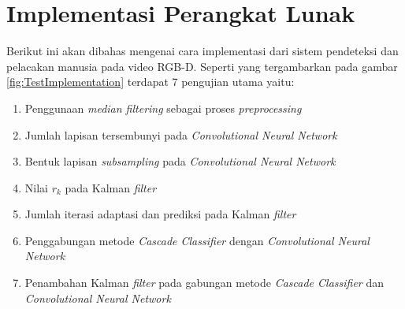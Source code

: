 \section{Implementasi Perangkat Lunak}
\noindent Berikut ini akan dibahas mengenai cara implementasi dari sistem pendeteksi dan pelacakan manusia pada video RGB-D. Seperti yang tergambarkan pada gambar \ref{fig:TestImplementation} terdapat 7 pengujian utama yaitu:
\begin{enumerate}
\item Penggunaan \textit{median filtering} sebagai proses \textit{preprocessing}
\item Jumlah lapisan tersembunyi pada \textit{Convolutional Neural Network}
\item Bentuk lapisan \textit{subsampling} pada \textit{Convolutional Neural Network}
\item Nilai $r_{k}$ pada Kalman \textit{filter}
\item Jumlah iterasi adaptasi dan prediksi pada Kalman \textit{filter}
\item Penggabungan metode \textit{Cascade Classifier} dengan \textit{Convolutional Neural Network}
\item Penambahan Kalman \textit{filter} pada gabungan metode \textit{Cascade Classifier} dan \textit{Convolutional Neural Network}\\
\end{enumerate}

\begin{adjustbox}{width=1\textwidth}
\noindent\begin{minipage}{\linewidth}
	\label{fig:TestImplementation}
\end{minipage}
\end{adjustbox}

